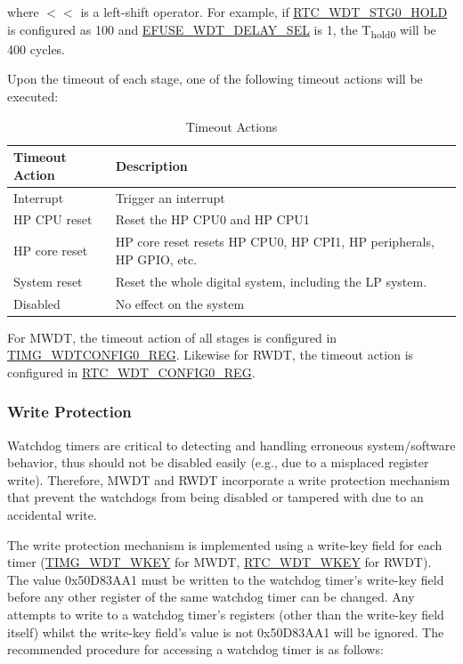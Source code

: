 \documentclass[main\_\_EN.tex]{subfiles}
\begin{document}
where $<<$ is a left-shift operator. For example, if \hyperref[fielddesc:RTCWDTSTG0HOLD]{RTC\_WDT\_STG0\_HOLD} is configured as 100 and \hyperref[fielddesc:EFUSEWDTDELAYSEL]{EFUSE\_WDT\_DELAY\_SEL} is 1, the T\textsubscript{hold0} will be 400 cycles.

Upon the timeout of each stage, one of the following timeout actions will be executed:

\begin{table}[H]
\centering
\caption{Timeout Actions}
\label{tab:wdt-timeout-action}

\begin{tabular}{|l|m{12cm}|}
\hline
\rowcolor{lightgray}
    \textbf{Timeout Action} & \textbf{Description} \\\hline


    Interrupt &  Trigger an interrupt \\ \hline
    HP CPU reset &  Reset the HP CPU0 and HP CPU1 \\ \hline
    HP core reset &  HP core reset resets HP CPU0, HP CPI1, HP peripherals, HP GPIO, etc. \\ \hline
    System reset &  Reset the whole digital system, including the LP system. \\ \hline
    Disabled &  No effect on the system \\ \hline

\end{tabular}
\end{table}

For MWDT, the timeout action of all stages is configured in \hyperref[regdesc:TIMGWDTCONFIG0REG]{TIMG\_WDTCONFIG0\_REG}. Likewise for RWDT, the timeout action is configured in \hyperref[regdesc:RTCWDTCONFIG0REG]{RTC\_WDT\_CONFIG0\_REG}.

\subsubsection{Write Protection}
Watchdog timers are critical to detecting and handling erroneous system/software behavior, thus should not be disabled easily (e.g., due to a misplaced register write). Therefore, MWDT and RWDT incorporate a write protection mechanism that prevent the watchdogs from being disabled or tampered with due to an accidental write.

The write protection mechanism is implemented using a write-key field for each timer (\hyperref[fielddesc:TIMGWDTWKEY]{TIMG\_WDT\_WKEY} for MWDT, \hyperref[fielddesc:RTCWDTWKEY]{RTC\_WDT\_WKEY} for RWDT). The value 0x50D83AA1 must be written to the watchdog timer's write-key field before any other register of the same watchdog timer can be changed. Any attempts to write to a watchdog timer's registers (other than the write-key field itself) whilst the write-key field's value is not 0x50D83AA1 will be ignored. The recommended procedure for accessing a watchdog timer is as follows:
\end{document}
